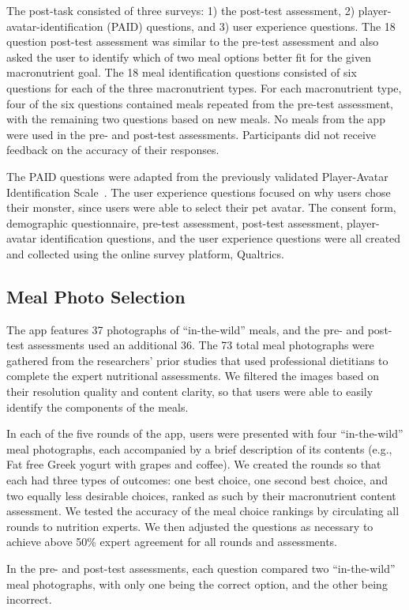 The post-task consisted of three surveys: 1) the post-test assessment, 2) player-avatar-identification (PAID) questions, and 3) user experience questions.
The 18 question post-test assessment was similar to the pre-test assessment and also asked the user to identify which of two meal options better fit for the given macronutrient goal.
The 18 meal identification questions consisted of six questions for each of the three macronutrient types. For each macronutrient type, four of the six questions contained meals repeated from the pre-test assessment, with the remaining two questions based on new meals. No meals from the app were used in the pre- and post-test assessments. Participants did not receive feedback on the accuracy of their responses. 

The PAID questions were adapted from the previously validated Player-Avatar Identification Scale~\cite{li2013player}. %
The user experience questions focused on why users chose their monster, since users were able to select their pet avatar. The consent form, demographic questionnaire, pre-test assessment, post-test assessment, player-avatar identification questions, and the user experience questions were all created and collected using the online survey platform, Qualtrics.

\vspace{-5pt}
\subsection{Meal Photo Selection}
The app features 37 photographs of ``in-the-wild'' meals, and the pre- and post-test assessments used an additional 36.
The 73 total meal photographs were gathered from the researchers' prior studies
that used professional dietitians to complete the expert nutritional assessments. We filtered the images based on their resolution quality and content clarity, so that users were able to easily identify the components of the meals.

In each of the five rounds of the app, users were presented with four ``in-the-wild'' meal photographs, each accompanied by a brief description of its contents (e.g., Fat free Greek yogurt with grapes and coffee). We created the rounds so that each had three types of outcomes: one best choice, one second best choice, and two equally less desirable choices, ranked as such by their macronutrient content assessment. We tested the accuracy of the meal choice rankings by circulating all rounds to nutrition experts. 
We then adjusted the questions as necessary to achieve above 50\% expert agreement for all rounds and assessments. 

In the pre- and post-test assessments, each question compared two ``in-the-wild'' meal photographs, with only one being the correct option, and the other being incorrect.
